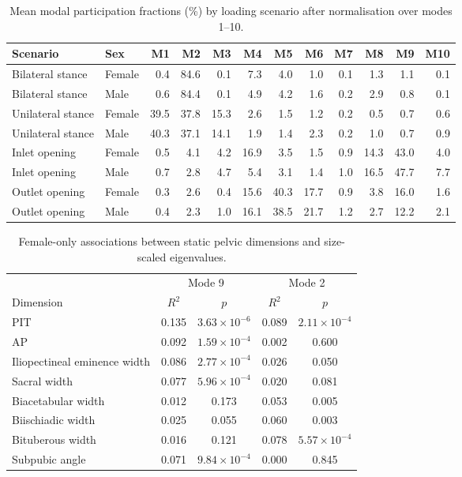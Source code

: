 \documentclass[openacc]{rsproca_new}
\begin{document}
\begin{table}[p]
\centering
\caption{Mean modal participation fractions (\%) by loading scenario after normalisation over modes 1--10.}
\label{tab:loadcases}
\begin{tabular}{llrrrrrrrrrr}
\toprule
Scenario & Sex & M1 & M2 & M3 & M4 & M5 & M6 & M7 & M8 & M9 & M10 \\
\midrule
Bilateral stance & Female & 0.4 & 84.6 & 0.1 & 7.3 & 4.0 & 1.0 & 0.1 & 1.3 & 1.1 & 0.1 \\
Bilateral stance & Male & 0.6 & 84.4 & 0.1 & 4.9 & 4.2 & 1.6 & 0.2 & 2.9 & 0.8 & 0.1 \\
Unilateral stance & Female & 39.5 & 37.8 & 15.3 & 2.6 & 1.5 & 1.2 & 0.2 & 0.5 & 0.7 & 0.6 \\
Unilateral stance & Male & 40.3 & 37.1 & 14.1 & 1.9 & 1.4 & 2.3 & 0.2 & 1.0 & 0.7 & 0.9 \\
Inlet opening & Female & 0.5 & 4.1 & 4.2 & 16.9 & 3.5 & 1.5 & 0.9 & 14.3 & 43.0 & 4.0 \\
Inlet opening & Male & 0.7 & 2.8 & 4.7 & 5.4 & 3.1 & 1.4 & 1.0 & 16.5 & 47.7 & 7.7 \\
Outlet opening & Female & 0.3 & 2.6 & 0.4 & 15.6 & 40.3 & 17.7 & 0.9 & 3.8 & 16.0 & 1.6 \\
Outlet opening & Male & 0.4 & 2.3 & 1.0 & 16.1 & 38.5 & 21.7 & 1.2 & 2.7 & 12.2 & 2.1 \\
\bottomrule
\end{tabular}
\end{table}

\begin{table}[p]
\centering
\caption{Female-only associations between static pelvic dimensions and size-scaled eigenvalues.}
\label{tab:staticassoc}
\begin{tabular}{lcccc}
\toprule
& \multicolumn{2}{c}{Mode 9} & \multicolumn{2}{c}{Mode 2} \\
\cmidrule(lr){2-3}\cmidrule(lr){4-5}
Dimension & $R^2$ & $p$ & $R^2$ & $p$ \\
\midrule
PIT & 0.135 & $3.63 \times 10^{-6}$ & 0.089 & $2.11 \times 10^{-4}$ \\
AP & 0.092 & $1.59 \times 10^{-4}$ & 0.002 & 0.600 \\
Iliopectineal eminence width & 0.086 & $2.77 \times 10^{-4}$ & 0.026 & 0.050 \\
Sacral width & 0.077 & $5.96 \times 10^{-4}$ & 0.020 & 0.081 \\
Biacetabular width & 0.012 & 0.173 & 0.053 & 0.005 \\
Biischiadic width & 0.025 & 0.055 & 0.060 & 0.003 \\
Bituberous width & 0.016 & 0.121 & 0.078 & $5.57 \times 10^{-4}$ \\
Subpubic angle & 0.071 & $9.84 \times 10^{-4}$ & 0.000 & 0.845 \\
\bottomrule
\end{tabular}
\end{table}
\end{document}
